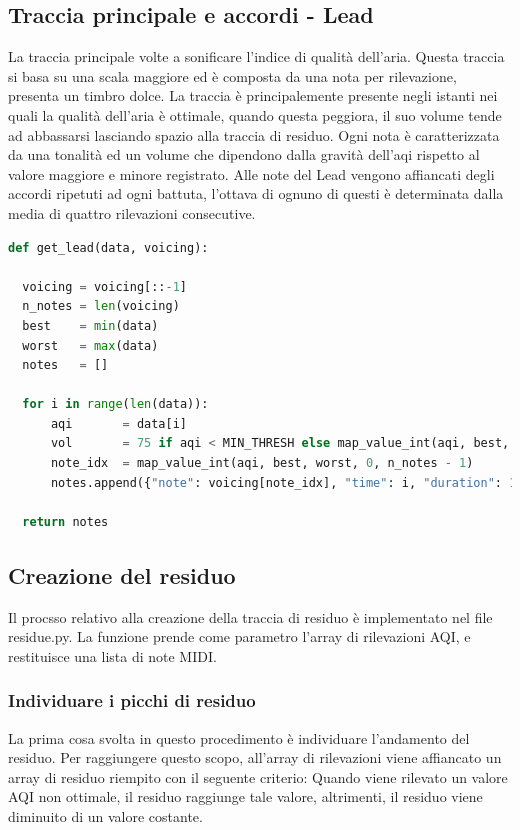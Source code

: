 \subsection{Traccia principale e accordi - Lead}
La traccia principale volte a sonificare l'indice di qualità dell'aria.
Questa traccia si basa su una scala maggiore ed è composta da una nota per rilevazione, presenta un timbro dolce.
La traccia è principalemente presente negli istanti nei quali la qualità dell'aria è ottimale, quando questa peggiora,
il suo volume tende ad abbassarsi lasciando spazio alla traccia di residuo.
Ogni nota è caratterizzata da una tonalità ed un volume che dipendono dalla gravità dell'aqi rispetto al valore maggiore e minore registrato.
Alle note del Lead vengono affiancati degli accordi ripetuti ad ogni battuta, l'ottava di ognuno di questi è determinata dalla media di quattro rilevazioni consecutive.
\begin{lstlisting}[language=Python]
def get_lead(data, voicing):

  voicing = voicing[::-1]
  n_notes = len(voicing)
  best    = min(data)
  worst   = max(data)
  notes   = []

  for i in range(len(data)):
      aqi       = data[i]
      vol       = 75 if aqi < MIN_THRESH else map_value_int(aqi, best, worst, 50, 25)
      note_idx  = map_value_int(aqi, best, worst, 0, n_notes - 1)
      notes.append({"note": voicing[note_idx], "time": i, "duration": 1, "volume": vol })

  return notes
\end{lstlisting}

\subsection{Creazione del residuo}
Il procsso relativo alla creazione della traccia di residuo è implementato nel file residue.py.
La funzione prende come parametro l'array di rilevazioni AQI, e restituisce una lista di note MIDI.
\subsubsection{Individuare i picchi di residuo}
La prima cosa svolta in questo procedimento è individuare l'andamento del residuo.
Per raggiungere questo scopo, all'array di rilevazioni viene affiancato un array di residuo riempito con il seguente criterio:
Quando viene rilevato un valore AQI non ottimale, il residuo raggiunge tale valore, altrimenti, il residuo viene diminuito di un valore costante.
